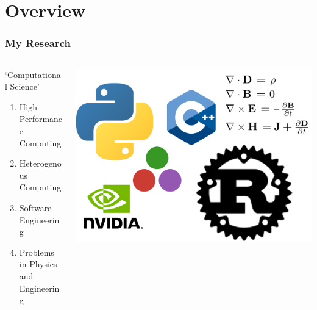\section{Overview}


\begin{frame}
    \frametitle{My Research}
    \begin{columns}
        \begin{column}{0.5\textwidth}
            `Computational Science'
           \begin{enumerate}
               \item High Performance Computing
               \item Heterogenous Computing
               \item Software Engineering
               \item Problems in Physics and Engineering
           \end{enumerate}
        \end{column}
        \begin{column}{0.5\textwidth}
            \begin{center}
                \begin{minipage}{0.48\textwidth}
                    \includegraphics[width=1.6\linewidth]{assets/collage.png}
                \end{minipage}
            \end{center}
        \end{column}
    \end{columns}
\end{frame}
